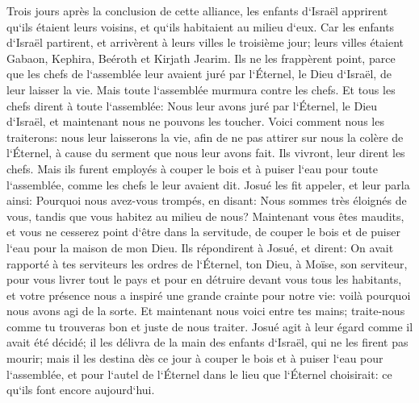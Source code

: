 \verse Trois jours après la conclusion de cette alliance, les enfants d`Israël apprirent qu`ils étaient leurs voisins, et qu`ils habitaient au milieu d`eux. 
\verse Car les enfants d`Israël partirent, et arrivèrent à leurs villes le troisième jour; leurs villes étaient Gabaon, Kephira, Beéroth et Kirjath Jearim. 
\verse Ils ne les frappèrent point, parce que les chefs de l`assemblée leur avaient juré par l`Éternel, le Dieu d`Israël, de leur laisser la vie. Mais toute l`assemblée murmura contre les chefs. 
\verse Et tous les chefs dirent à toute l`assemblée: Nous leur avons juré par l`Éternel, le Dieu d`Israël, et maintenant nous ne pouvons les toucher. 
\verse Voici comment nous les traiterons: nous leur laisserons la vie, afin de ne pas attirer sur nous la colère de l`Éternel, à cause du serment que nous leur avons fait. 
\verse Ils vivront, leur dirent les chefs. Mais ils furent employés à couper le bois et à puiser l`eau pour toute l`assemblée, comme les chefs le leur avaient dit. 
\verse Josué les fit appeler, et leur parla ainsi: Pourquoi nous avez-vous trompés, en disant: Nous sommes très éloignés de vous, tandis que vous habitez au milieu de nous? 
\verse Maintenant vous êtes maudits, et vous ne cesserez point d`être dans la servitude, de couper le bois et de puiser l`eau pour la maison de mon Dieu. 
\verse Ils répondirent à Josué, et dirent: On avait rapporté à tes serviteurs les ordres de l`Éternel, ton Dieu, à Moïse, son serviteur, pour vous livrer tout le pays et pour en détruire devant vous tous les habitants, et votre présence nous a inspiré une grande crainte pour notre vie: voilà pourquoi nous avons agi de la sorte. 
\verse Et maintenant nous voici entre tes mains; traite-nous comme tu trouveras bon et juste de nous traiter. 
\verse Josué agit à leur égard comme il avait été décidé; il les délivra de la main des enfants d`Israël, qui ne les firent pas mourir; 
\verse mais il les destina dès ce jour à couper le bois et à puiser l`eau pour l`assemblée, et pour l`autel de l`Éternel dans le lieu que l`Éternel choisirait: ce qu`ils font encore aujourd`hui. 

